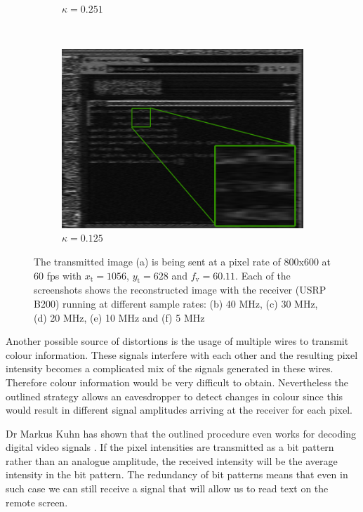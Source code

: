 \documentclass[a4paper,12pt,twoside,openright]{report}
\begin{document}
\begin{figure}[p!]
\begin{subfigure}[b]{0.45\textwidth}
  \caption{$\kappa = 0.251$}
\end{subfigure} ~
\begin{subfigure}[b]{0.45\textwidth}
  \includegraphics[width=\textwidth]{sr_5MHz_at_190MHz}
  \caption{$\kappa = 0.125$}
\end{subfigure}
\caption{The transmitted image (a) is being sent at a pixel rate of 800x600 at 60 fps with $x_\text{t} = 1056$, $y_\text{t} = 628$ and $f_\text{v} = 60.11$. Each of the screenshots shows the reconstructed image with the receiver (USRP B200) running at different sample rates: (b) 40 MHz, (c) 30 MHz, (d) 20 MHz, (e) 10 MHz and (f) 5 MHz}
\label{fig:samplerates}
\end{figure}

Another possible source of distortions is the usage of multiple wires to transmit colour information. These signals interfere with each other and the resulting pixel intensity becomes a complicated mix of the signals generated in these wires. Therefore colour information would be very difficult to obtain. Nevertheless the outlined strategy allows an eavesdropper to detect changes in colour since this would result in different signal amplitudes arriving at the receiver for each pixel.

Dr Markus Kuhn has shown that the outlined procedure even works for decoding digital video signals \cite{kuhn2005electromagnetic}. If the pixel intensities are transmitted as a bit pattern rather than an analogue amplitude, the received intensity will be the average intensity in the bit pattern. The redundancy of bit patterns means that even in such case we can still receive a signal that will allow us to read text on the remote screen. 
\end{document}
